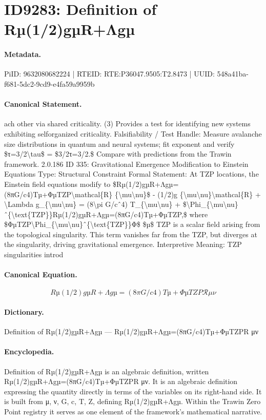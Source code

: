 \section*{ID9283: Definition of Rµ(1/2)gµR+Λgµ}
\paragraph{Metadata.}
PiID: 9632080682224 | RTEID: RTE:P36047.9505:T2.8473 | UUID: 548a41ba-f681-5dc2-9cd9-e4fa59a9959b

\paragraph{Canonical Statement.}
ach other via shared criticality. (3) Provides a test for identifying new systems exhibiting selforganized criticality. Falsifiability / Test Handle: Measure avalanche size distributions in quantum and neural systems; fit exponent and verify \$τ=3/2\textbackslash{}tau\$ = \$3/2τ=3/2.\$ Compare with predictions from the Trawin framework. 2.0.186 ID 335: Gravitational Emergence Modification to Einstein Equations Type: Structural Constraint Formal Statement: At TZP locations, the Einstein field equations modify to \$Rµ(1/2)gµR+Λgµ=(8πG/c4)Tµ+ΦµTZP\textbackslash{}mathcal\{R\} \{\textbackslash{}mu\textbackslash{}nu\}\$ - (1/2)g \{\textbackslash{}mu\textbackslash{}nu\}\textbackslash{}mathcal\{R\} + \textbackslash{}Lambda g\_\{\textbackslash{}mu\textbackslash{}nu\} = (8\textbackslash{}pi G/cˆ4) T\_\{\textbackslash{}mu\textbackslash{}nu\} + \$\textbackslash{}Phi\_\{\textbackslash{}mu\textbackslash{}nu\}ˆ\{\textbackslash{}text\{TZP\}\}Rµ(1/2)gµR+Λgµ=(8πG/c4)Tµ+ΦµTZP,\$ where \$ΦµTZP\textbackslash{}Phi\_\{\textbackslash{}mu\textbackslash{}nu\}ˆ\{\textbackslash{}text\{TZP\}\}Φ\$ \$µ\$ TZP is a scalar field arising from the topological singularity. This term vanishes far from the TZP, but diverges at the singularity, driving gravitational emergence. Interpretive Meaning: TZP singularities introd

\paragraph{Canonical Equation.}
\[
Rµ(1/2)gµR+Λgµ=(8πG/c4)Tµ+ΦµTZP\mathcal{R} {\mu\nu}
\]

\paragraph{Dictionary.}
Definition of Rµ(1/2)gµR+Λgµ — Rµ(1/2)gµR+Λgµ=(8πG/c4)Tµ+ΦµTZPR μν

\paragraph{Encyclopedia.}
Definition of Rµ(1/2)gµR+Λgµ is an algebraic definition, written Rµ(1/2)gµR+Λgµ=(8πG/c4)Tµ+ΦµTZPR μν. It is an algebraic definition expressing the quantity directly in terms of the variables on its right-hand side. It is built from μ, ν, G, c, T, Z, defining Rµ(1/2)gµR+Λgµ. Within the Trawin Zero Point registry it serves as one element of the framework's mathematical narrative.
